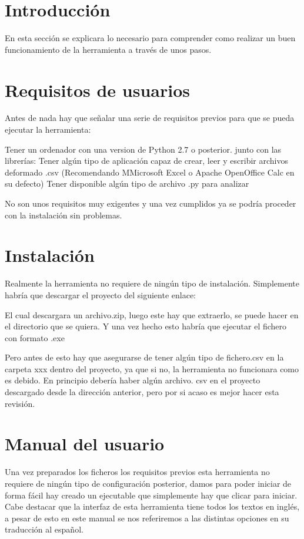 
\section{Introducción}
En esta sección se explicara lo necesario para comprender como realizar un buen funcionamiento de la herramienta  a través de  unos pasos.
\section{Requisitos de usuarios}
Antes de nada hay que señalar una serie de requisitos previos para que se pueda ejecutar la herramienta:

Tener un ordenador con una version de Python 2.7 o posterior. junto con las librerías:
Tener algún tipo de aplicación capaz de crear, leer y escribir archivos deformado .csv (Recomendando MMicrosoft Excel o Apache OpenOffice Calc en su defecto)
Tener disponible algún tipo de  archivo .py para analizar

No son unos requisitos muy exigentes y una vez cumplidos ya se podría proceder con la instalación sin problemas.

\section{Instalación}
Realmente la herramienta no requiere de ningún tipo de instalación. Simplemente habría que descargar el proyecto del siguiente enlace:

El cual descargara un archivo.zip, luego este hay que extraerlo, se puede hacer en el directorio que se quiera. Y una vez hecho esto habría que ejecutar el fichero con formato .exe

Pero antes de esto hay que asegurarse de tener algún tipo de fichero.csv en la carpeta xxx dentro del proyecto, ya que si no, la  herramienta no funcionara como es debido. En principio debería haber algún archivo. csv en el proyecto descargado desde la dirección anterior, pero por si acaso es mejor hacer esta revisión.

\section{Manual del usuario}

Una vez preparados los ficheros los requisitos previos esta herramienta no requiere de ningún tipo de configuración posterior, damos para poder iniciar de forma fácil hay creado un ejecutable que simplemente hay que clicar para iniciar. Cabe destacar que la interfaz de esta herramienta tiene todos los textos en inglés, a pesar de esto en este manual se nos referiremos a las distintas opciones en su traducción al español.\\

